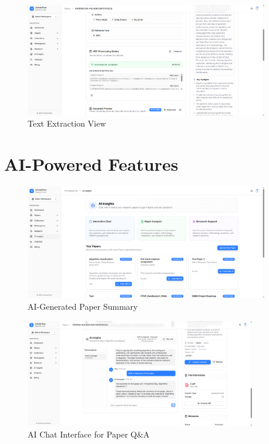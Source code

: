 \begin{figure}[H]
\centering
\includegraphics[width=0.95\textwidth]{images/screenshots/text_extractions.png}
\caption{Text Extraction View}
\label{fig:screenshot-text-extraction}
\end{figure}

\section{AI-Powered Features}
\label{sec:screenshots-ai}

\begin{figure}[H]
\centering
\includegraphics[width=0.95\textwidth]{images/screenshots/ai_insights.png}
\caption{AI-Generated Paper Summary}
\label{fig:screenshot-ai-summary}
\end{figure}

\begin{figure}[H]
\centering
\includegraphics[width=0.9\textwidth]{images/screenshots/ai_chat.png}
\caption{AI Chat Interface for Paper Q\&A}
\label{fig:screenshot-ai-chat}
\end{figure}

